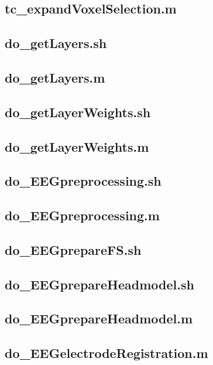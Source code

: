 \documentclass[12pt,a4paper]{scrartcl}
\begin{document}
\subsection{tc\_expandVoxelSelection.m}

\subsection{do\_getLayers.sh}
\label{sec:getLyr}

\subsection{do\_getLayers.m}

\subsection{do\_getLayerWeights.sh}
\label{sec:getLyrW}

\subsection{do\_getLayerWeights.m}

\subsection{do\_EEGpreprocessing.sh}
\label{sec:EEGpreproc}

\subsection{do\_EEGpreprocessing.m}

\subsection{do\_EEGprepareFS.sh}
\label{sec:prepFS4EEG}

\subsection{do\_EEGprepareHeadmodel.sh}
\label{sec:prepHM}

\subsection{do\_EEGprepareHeadmodel.m}

\subsection{do\_EEGelectrodeRegistration.m}
\label{sec:elecReg}
\end{document}
